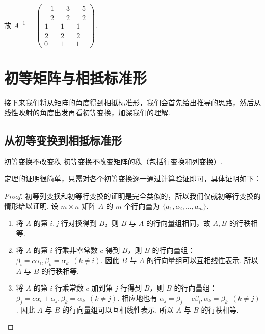 \begin{solution}
    故 $A^{-1} =
        \begin{pmatrix}
            -\dfrac{1}{2} & -\dfrac{3}{2} & -\dfrac{5}{2} \\
            \dfrac{1}{2}  & \dfrac{1}{2}  & \dfrac{1}{2}  \\
            0            & 1            & 1
        \end{pmatrix}$.
\end{solution}

\section{初等矩阵与相抵标准形}

接下来我们将从矩阵的角度得到相抵标准形，我们会首先给出推导的思路，然后从线性映射的角度出发再看初等变换，加深我们的理解.

\subsection{从初等变换到相抵标准形}

\begin{theorem}{}{初等变换不改变秩}
    初等变换不改变矩阵的秩（包括行变换和列变换）.
\end{theorem}

定理的证明很简单，只需对各个初等变换逐一通过计算验证即可，具体证明如下：

\begin{proof}
    初等列变换和初等行变换的证明是完全类似的，所以我们仅就初等行变换的情形给以证明. 设 $m\times n$ 矩阵 $A$ 的 $m$ 个行向量为 $\{ a_1, a_2, \ldots, a_m \}$.
    \begin{enumerate}
        \item 将 $A$ 的第 $i, j$ 行对换得到 $B$，则 $B$ 与 $A$ 的行向量组相同，故 $A, B$ 的行秩相等.
        \item 将 $A$ 的第 $i$ 行乘非零常数 $c$ 得到 $B$，则 $B$ 的行向量组：$\beta_i = c\alpha_i, \beta_k = \alpha_k \enspace (k \neq i)$. 因此 $B$ 与 $A$ 的行向量组可以互相线性表示. 所以 $A$ 与 $B$ 的行秩相等.
        \item 将 $A$ 的第 $i$ 行乘常数 $c$ 加到第 $j$ 行得到 $B$，则 $B$ 的行向量组：$\beta_j = c\alpha_i + \alpha_j,\allowbreak \beta_k = \alpha_k \enspace (k \neq j)$. 相应地也有 $\alpha_j = \beta_j - c\beta_i, \alpha_k = \beta_k \enspace (k \neq j)$. 因此 $A$ 与 $B$ 的行向量组可以互相线性表示. 所以 $A$ 与 $B$ 的行秩相等.
    \end{enumerate}
\end{proof}

